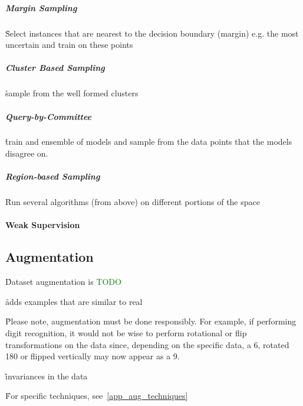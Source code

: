 \subparagraph{Margin Sampling}

\r{Select instances that are nearest to the decision boundary (margin) e.g. the most uncertain and train on these points}

\subparagraph{Cluster Based Sampling}

\r{sample from the well formed clusters}

\subparagraph{Query-by-Committee}

\r{train and ensemble of models and sample from the data points that the models disagree on.}

\subparagraph{Region-based Sampling}

\r{Run several algorithms (from above) on different portions of the space}


\paragraph{Weak Supervision}




\subsection{Augmentation}

\r{Dataset augmentation is \textcolor{green}{TODO}}

\r{adds examples that are similar to real}


\r{Please note, augmentation must be done responsibly. For example, if performing digit recognition, it would not be wise to perform rotational or flip transformations on the data since, depending on the specific data, a 6, rotated 180 or flipped vertically may now appear as a 9.}


\r{invariances in the data}

\r{For specific techniques, see~\ref{app_aug_techniques}}



